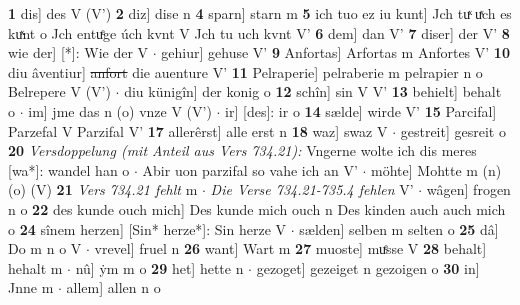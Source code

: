 \documentclass[8pt,a4paper,notitlepage]{article}
\begin{document}
\begin{table}[ht]
\begin{minipage}[t]{0.5\linewidth}
\textbf{1} dis] des V (V') \textbf{2} diz] dise n \textbf{4} sparn] starn m \textbf{5} ich tuo ez iu kunt] Jch tuͯ uͯch es kuͯnt o Jch entuͤge úch kvnt V Jch tu uch kvnt V' \textbf{6} dem] dan V' \textbf{7} diser] der V' \textbf{8} wie der] [*]: Wie der V  $\cdot$ gehiur] gehuse V' \textbf{9} Anfortas] Arfortas m Anfortes V' \textbf{10} diu âventiur] \sout{anfort} die auenture V' \textbf{11} Pelraperie] pelraberie m pelrapier n o Belrepere V (V')  $\cdot$ diu künigîn] der konig o \textbf{12} schîn] sin V V' \textbf{13} behielt] behalt o  $\cdot$ im] jme das n (o) vnze V (V')  $\cdot$ ir] [des]: ir o \textbf{14} sælde] wirde V' \textbf{15} Parcifal] Parzefal V Parzifal V' \textbf{17} allerêrst] alle erst n \textbf{18} waz] swaz V  $\cdot$ gestreit] gesreit o \textbf{20} \textit{Versdoppelung (mit Anteil aus Vers 734.21):} Vngerne wolte ich dis meres [wa*]: wandel han o   $\cdot$ Abir uon parzifal so vahe ich an V'  $\cdot$ möhte] Mohtte m (n) (o) (V) \textbf{21} \textit{Vers 734.21 fehlt} m   $\cdot$ \textit{Die Verse 734.21-735.4 fehlen} V'   $\cdot$ wâgen] frogen n o \textbf{22} des kunde ouch mich] Des kunde mich ouch n Des kinden auch auch mich o \textbf{24} sînem herzen] [Sin* herze*]: Sin herze V  $\cdot$ sælden] selben m selten o \textbf{25} dâ] Do m n o V  $\cdot$ vrevel] fruel n \textbf{26} want] Wart m \textbf{27} muoste] muͤsse V \textbf{28} behalt] hehalt m  $\cdot$ nû] ẏm m o \textbf{29} het] hette n  $\cdot$ gezoget] gezeiget n gezoigen o \textbf{30} in] Jnne m  $\cdot$ allem] allen n o \newline
\end{minipage}
\end{table}
\newpage
\end{document}
